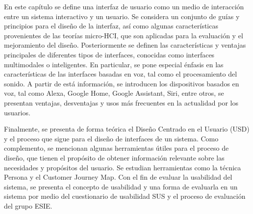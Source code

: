 En este capítulo se define una interfaz de usuario como un medio de interacción entre un sistema interactivo y un usuario. Se considera un conjunto de guías y principios para el diseño de la interfaz, así como algunas características provenientes de las teorías micro-HCI, que son aplicadas para la evaluación y el mejoramiento del diseño.
Posteriormente se definen las características y ventajas principales de diferentes tipos de interfaces, conocidas como interfaces multimodales o inteligentes. En particular, se pone especial énfasis en las características de las interfaces basadas en voz, tal como el procesamiento del sonido. A partir de está información, se introducen los dispositivos basados en voz, tal como Alexa, Google Home, Google Assistant, Siri, entre otros, se presentan ventajas, desventajas y usos más frecuentes en la actualidad por los usuarios.

Finalmente, se presenta de forma teórica el Diseño Centrado en el Usuario (USD) y el proceso que sigue para el diseño de interfaces de un sistema. Como complemento, se mencionan algunas herramientas útiles para el proceso de diseño, que tienen el propósito de obtener información relevante sobre las necesidades y propósitos del usuario. Se estudian herramientas como la técnica Persona y el Customer Journey Map. Con el fin de evaluar la usabilidad del sistema, se presenta el concepto de usabilidad y una forma de evaluarla en un sistema por medio del cuestionario de usabilidad SUS y el proceso de evaluación del grupo ESIE.
